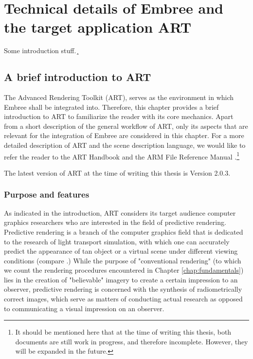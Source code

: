\chapter{Technical details of Embree and the target application ART}

Some introduction stuff.¸ 

\section{A brief introduction to ART}
\label{chap:art}

The Advanced Rendering Toolkit (ART), serves as the environment in which Embree shall be integrated into. Therefore, this chapter provides a brief introduction to ART to familiarize the reader with its core mechanics. Apart from a short description of the general workflow of ART, only its aspects that are relevant for the integration of Embree are considered in this chapter. For a more detailed description of ART and the scene description language, we would like to refer the reader to the ART Handbook \cite{arthandbook} and the ARM File Reference Manual \cite{artreferencemanual}.\footnote{It should be mentioned here that at the time of writing this thesis, both documents are still work in progress, and therefore incomplete. However, they will be expanded in the future.}

The latest version of ART at the time of writing this thesis is Version 2.0.3.


\subsection{Purpose and features}

As indicated in the introduction, ART considers its target audience computer graphics researchers who are interested in the field of predictive rendering. Predictive rendering is a branch of the computer graphics field that is dedicated to the research of light transport simulation, with which one can accurately predict the appearance of tan object or a virtual scene under different viewing conditions (compare \cite{wilkie2009predictive}.)  While the purpose of "conventional rendering" (to which we count the rendering procedures encountered in Chapter \ref{chap:fundamentals}) lies in the creation of "believable" imagery to create a certain impression to an observer, predictive rendering is concerned with the synthesis of radiometrically correct images, which serve as matters of conducting actual research as opposed to communicating a visual impression on an observer.


